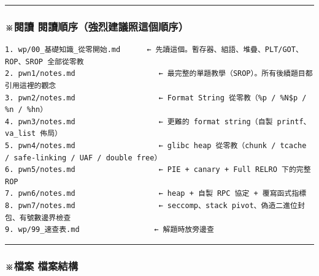 \documentclass[10pt,a4paper]{article}
\begin{document}
\begin{center}\rule{0.5\linewidth}{0.5pt}\end{center}

\subsubsection{※閱讀
閱讀順序（強烈建議照這個順序）}\label{ux95b1ux8b80-ux95b1ux8b80ux9806ux5e8fux5f37ux70c8ux5efaux8b70ux7167ux9019ux500bux9806ux5e8f}

\begin{Verbatim}[breaklines=true,breakanywhere=true,breakautoindent=false,fontsize=\fontsize{7.0}{9.5}\selectfont]
1. wp/00_基礎知識_從零開始.md      ← 先讀這個。暫存器、組語、堆疊、PLT/GOT、ROP、SROP 全部從零教
2. pwn1/notes.md                   ← 最完整的單題教學（SROP）。所有後續題目都引用這裡的觀念
3. pwn2/notes.md                   ← Format String 從零教（%p / %N$p / %n / %hn）
4. pwn3/notes.md                   ← 更難的 format string（自製 printf、va_list 佈局）
5. pwn4/notes.md                   ← glibc heap 從零教（chunk / tcache / safe-linking / UAF / double free）
6. pwn5/notes.md                   ← PIE + canary + Full RELRO 下的完整 ROP
7. pwn6/notes.md                   ← heap + 自製 RPC 協定 + 覆寫函式指標
8. pwn7/notes.md                   ← seccomp、stack pivot、偽造二進位封包、有號數邊界檢查
9. wp/99_速查表.md                 ← 解題時放旁邊查
\end{Verbatim}

\begin{center}\rule{0.5\linewidth}{0.5pt}\end{center}

\subsubsection{※檔案
檔案結構}\label{ux6a94ux6848-ux6a94ux6848ux7d50ux69cb}
\end{document}
